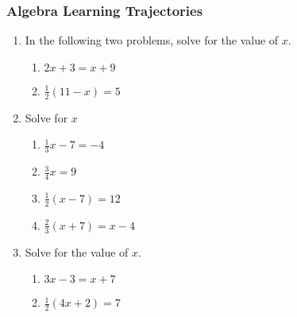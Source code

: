

\fancyhead[LE]{\thepage}



\subsubsection*{Algebra Learning Trajectories}
\begin{enumerate}
  \subsubsection*{Solving linear equations in one unknown}
\item In the following two problems, solve for the value of $x$.
  \begin{multicols}{2}
    \begin{enumerate}
      \item   $2x+3=x + 9$ %
      \item   $\frac{1}{2}(11-x)=5$ %
    \end{enumerate}
  \end{multicols}

\item Solve for $x$
\begin{multicols}{2}
  \begin{enumerate}%
    \item $\frac{1}{3} x-7=-4$
    \item $\frac{3}{4}x =9$
    \item $\frac{1}{2}(x-7)=12$
    \item $\frac{2}{3}(x+7)=x-4$
  \end{enumerate}
\end{multicols} %

\item Solve for the value of $x$.
  \begin{multicols}{2}
    \begin{enumerate}
      \item   $3x-3=x + 7$ %
      \item   $\frac{1}{2}(4x+2)=7$ %
    \end{enumerate}
  \end{multicols}


\end{enumerate}
